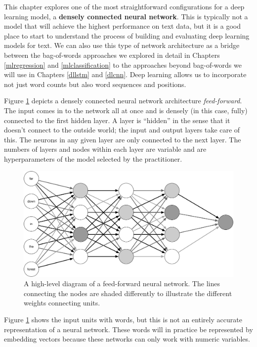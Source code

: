 \documentclass[
]{krantz}
\begin{document}
This chapter explores one of the most straightforward configurations for a deep learning model, a \textbf{densely connected neural network}. This is typically not a model that will achieve the highest performance on text data, but it is a good place to start to understand the process of building and evaluating deep learning models for text. We can also use this type of network architecture as a bridge between the bag-of-words approaches we explored in detail in Chapters \ref{mlregression} and \ref{mlclassification} to the approaches beyond bag-of-words we will use in Chapters \ref{dllstm} and \ref{dlcnn}. Deep learning allows us to incorporate not just word counts but also word sequences and positions.

Figure \ref{fig:dnndiag} depicts a densely connected neural network architecture \emph{feed-forward}. The input comes in to the network all at once and is densely (in this case, fully) connected to the first hidden layer. A layer is ``hidden'' in the sense that it doesn't connect to the outside world; the input and output layers take care of this. The neurons in any given layer are only connected to the next layer. The numbers of layers and nodes within each layer are variable and are hyperparameters of the model selected by the practitioner.

\begin{figure}

{\centering \includegraphics[width=0.9\linewidth]{diagram-files/dnn-architecture} 

}

\caption{A high-level diagram of a feed-forward neural network. The lines connecting the nodes are shaded differently to illustrate the different weights connecting units.}\label{fig:dnndiag}
\end{figure}

Figure \ref{fig:dnndiag} shows the input units with words, but this is not an entirely accurate representation of a neural network. These words will in practice be represented by embedding vectors because these networks can only work with numeric variables.
\end{document}
